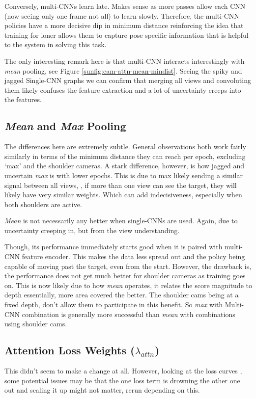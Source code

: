 Conversely, multi-CNNs learn late. Makes sense as more passes allow each CNN (now seeing only one frame not all) to learn slowly. Therefore, the multi-CNN policies have a more decisive dip in minimum distance reinforcing the idea that training for loner allows them to capture pose specific information that is helpful to the system in solving this task.

The only interesting remark here is that multi-CNN interacts interestingly with \emph{mean} pooling, see Figure \ref{sunfig:cam-attn-mean-mindist}. Seeing the spiky and jagged Single-CNN graphs we can confirm  that merging all views and convoluting them likely confuses the feature extraction and a lot of uncertainty creeps into the features.


\subsection{\emph{Mean} and \emph{Max} Pooling}
The differences here are extremely subtle. General observations both work fairly similarly in terms of the minimum distance they can reach per epoch, excluding `max' and the shoulder cameras. A stark difference, however, is how jagged and uncertain \emph{max} is with lower epochs. This is due to max likely sending a similar signal between all views, , if more than one view can see the target, they will likely have very similar weights. Which can add indecisiveness, especially when both shoulders are active.

\emph{Mean} is not necessarily any better when single-CNNs are used. Again, due to uncertainty creeping in, but from the view understanding.

Though, its performance immediately starts good when it is paired with multi-CNN feature encoder. This makes the data less spread out  and the policy being capable of moving past the target, even from the start. However, the drawback is, the performance does not get much better for shoulder cameras as training goes on. This is now likely due to how \emph{mean} operates, it relates the score magnitude to depth essentially, more area covered the better. The shoulder cams being at a fixed depth, don't allow them to participate in this benefit. So \emph{max} with Multi-CNN combination is generally more successful than \emph{mean} with combinations using shoulder cams.

\subsection{Attention Loss Weights ($\lambda_{attn}$)}
This didn't seem to make a change at all. However, looking at the loss curves , some potential issues may be that the one loss term is drowning the other one out and scaling it up might not matter, rerun depending on this.



